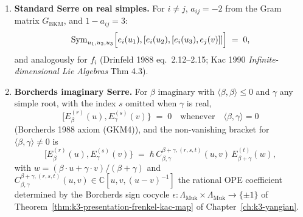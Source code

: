 \begin{theorem}
\begin{enumerate}[label=\textup{(Y\arabic*)}, leftmargin=2.4em]
\[ \frac{E_\gamma^{(s)}(u)-E_\gamma^{(s)}(v)}{u-v},\quad\;
 [E_\beta^{(r)}(u),F_\gamma^{(s)}(v)\}
 \;=\; \hbar\,\delta_{\beta,\gamma}\,\delta_{rs}\,
 \frac{H_\beta^{(r)}(u)-H_\beta^{(r)}(v)}{u-v}.
 \]
\item \textbf{Standard Serre on real simples.} For $i\neq j$,
 $a_{ij} = -2$ from the Gram matrix $G_{\mathrm{BKM}}$, and
 $1-a_{ij} = 3$:
 \[
 \mathrm{Sym}_{u_1,u_2,u_3}\Bigl[
 e_i(u_1),[e_i(u_2),[e_i(u_3),e_j(v)]]\Bigr] \;=\; 0,
 \]
 and analogously for $f_i$ (Drinfeld 1988 eq.~2.12--2.15; Kac 1990
 \emph{Infinite-dimensional Lie Algebras} Thm 4.3).
\item \textbf{Borcherds imaginary Serre.} For $\beta$ imaginary with
 $\langle\beta,\beta\rangle\leq 0$ and $\gamma$ any simple root, with
 the index $s$ omitted when $\gamma$ is real,
 \[
 \bigl[E_\beta^{(r)}(u), E_\gamma^{(s)}(v)\bigr\}
 \;=\; 0
 \quad\text{whenever}\quad \langle\beta,\gamma\rangle = 0
 \]
 (Borcherds 1988 axiom \textup{(GKM4)}), and the non-vanishing bracket
 for $\langle\beta,\gamma\rangle\neq 0$ is
 \[
 [E_\beta^{(r)}(u), E_\gamma^{(s)}(v)\}
 \;=\; \hbar\,
 C^{\beta+\gamma,(r,s,t)}_{\beta,\gamma}(u,v)\,
 E_{\beta+\gamma}^{(t)}(w),
 \]
 with $w=(\beta\cdot u+\gamma\cdot v)/(\beta+\gamma)$ and
 $C^{\beta+\gamma,(r,s,t)}_{\beta,\gamma}(u,v) \in
 \mathbb{C}[u,v,(u-v)^{-1}]$ the rational OPE coefficient determined
 by the Borcherds sign cocycle
 $\epsilon\colon\Lambda_{\mathrm{Muk}}\times\Lambda_{\mathrm{Muk}}
 \to\{\pm 1\}$ of Theorem~\ref{thm:k3-presentation-frenkel-kac-map}
 of Chapter~\ref{ch:k3-yangian}.
\end{enumerate}
\end{theorem}

